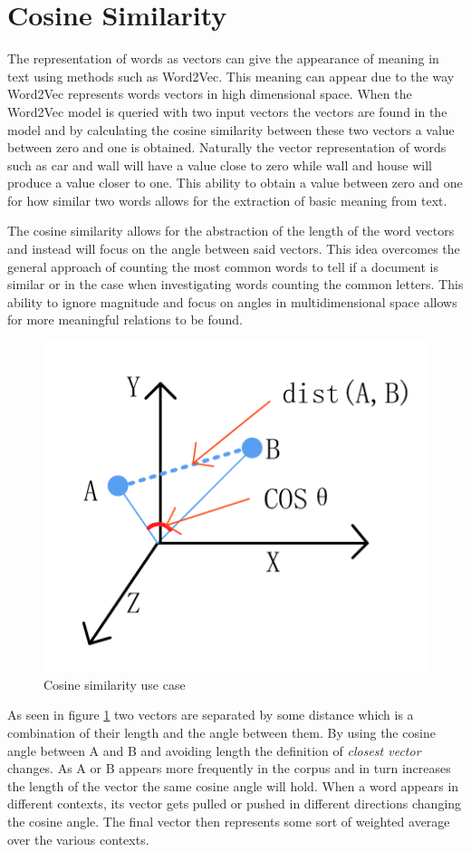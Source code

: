\section{Cosine Similarity}
 The representation of words as vectors can give the appearance of meaning in text using methods such as Word2Vec. This meaning can appear due to the way Word2Vec represents words vectors in high dimensional space. When the Word2Vec model is queried with two input vectors the vectors are found in the model and by calculating the cosine similarity between these two vectors a value between zero and one is obtained. Naturally the vector representation of words such as car and wall will have a value close to zero while wall and house will produce a value closer to one. This ability to obtain a value between zero and one for how similar two words allows for the extraction of basic meaning from text. 
 
 The cosine similarity allows for the abstraction of the length of the word vectors and instead will focus on the angle between said vectors. This idea overcomes the general approach of counting the most common words to tell if a document is similar or in the case when investigating words counting the common letters. This ability to ignore magnitude and focus on angles in multidimensional space allows for more meaningful relations to be found.
 
 \begin{figure}[h]
    \centering
    \includegraphics[width=.8\textwidth]{images/cosine_sim.png}
    \caption{Cosine similarity use case}
    \label{fig:cosine_vectors}
\end{figure}

\noindent
As seen in figure \ref{fig:cosine_vectors} \cite{Wang1} two vectors are separated by some distance which is a combination of their length and the angle between them. By using the cosine angle between A and B and avoiding length the definition of \textit{closest vector} changes. As A or B appears more frequently in the corpus and in turn increases the length of the vector the same cosine angle will hold. When a word appears in different contexts, its vector gets pulled or pushed in different directions changing the cosine angle. The final vector then represents some sort of weighted average over the various contexts. 

